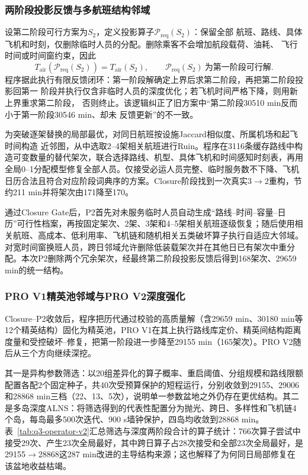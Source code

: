 \documentclass[UTF8,a4paper,zihao=5]{ctexart}
\begin{document}
\subsubsection{两阶段投影反馈与多航班结构邻域}

设第二阶段可行方案为$S_2$，定义投影算子$\mathcal{P}_{\mathrm{req}}(S_2)$：保留全部
航班、路线、具体飞机和时刻，仅删除临时人员的分配。删除乘客不会增加航段载荷、油耗、
飞行时间或时间窗约束，因此
\begin{equation}
  T_{\mathrm{air}}\!\left(\mathcal{P}_{\mathrm{req}}(S_2)\right)
  =T_{\mathrm{air}}(S_2),
  \qquad
  \mathcal{P}_{\mathrm{req}}(S_2)\ \text{为第一阶段可行解}.
  \label{eq:q3-stage2-projection}
\end{equation}
程序据此执行有限反馈闭环：第一阶段解确定上界后求第二阶段，再把第二阶段投影回第一
阶段并执行仅含非临时人员的深度优化；若飞机时间严格下降，则用新上界重求第二阶段，
否则终止。该逻辑纠正了旧方案中“第二阶段30510 min反而小于第一阶段30546 min、却未
反馈更新”的不一致。

为突破逐架替换的局部最优，对同日航班按设施Jaccard相似度、所属机场和起飞时间构造
近邻图，从中选取2--4架相关航班进行Ruin。程序在3116条缓存路线中构造可变数量的替代架次，联合选择路线、机型、具体飞机和时间感知时刻表，再用全局0--1分配模型修复全部人员。仅接受必运人员完整、临时服务数不下降、飞机日历合法且符合对应阶段词典序的方案。Closure阶段找到一次真实$3\to2$重构，节约211 min并将架次由171降至170。

通过Closure Gate后，P2首先对未服务临时人员自动生成“路线--时间--容量--日历”可行性档案，再按固定架次、2架、3架和4--5架相关航班逐级恢复；随后使用相关航班、高成本、低利用率、飞机链和随机相关五类破坏算子执行自适应大邻域。对宽时间窗换班人员，跨日邻域允许删除低装载架次并在其他日已有架次中重分配。本次P2删除两个冗余架次，经最终第二阶段投影反馈后得到168架次、29659 min的统一结构。

\subsubsection{PRO V1精英池邻域与PRO V2深度强化}

Closure--P2收敛后，程序把历代通过校验的高质量解（含29659 min、30180 min等12个精英结构）固化为精英池，PRO V1在其上执行路线库定价、精英间结构距离度量和受控破坏--修复，把第一阶段进一步降至29155 min（165架次）。PRO V2随后从三个方向继续深挖。

其一是异构参数筛选：以20组差异化的算子概率、重启阈值、分组规模和路线限额配置各配2个固定种子，共40次受预算保护的短程运行，分别收敛到29155、29006和28868 min三档（22、13、5次），说明单一参数盆地之外仍存在更优结构。其二是多岛深度ALNS：将筛选得到的代表性配置分为抛光、跨日、多样性和飞机链4个岛，每岛最多500次迭代、900 s墙钟保护，四岛均收敛到28868 min。表~\ref{tab:q3-operator-v2}汇总筛选与深度两阶段合计的算子统计：766次算子尝试中接受29次、产生23次全局最好，其中跨日算子占28次接受和全部23次全局最好，是29155$\to$28868这287 min改进的主导结构来源；这也解释了为何同日局部修复在该盆地收益枯竭。
\end{document}

